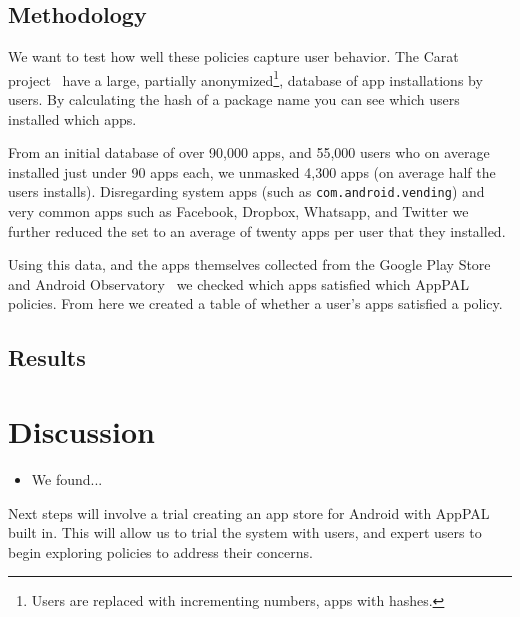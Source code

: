 \documentclass[twocolumn,letterpaper]{soups-poster}
\newcommand{\citep}[1]{\cite{#1}}
\begin{document}
\subsection{Methodology}

We want to test how well these policies capture user behavior.
The Carat project~\citep{Oliner:2013ht} have a large, partially
anonymized\footnote{Users are replaced with incrementing numbers, apps with
hashes.},
database of app installations by users.  By calculating the hash of a package
name you can see which users installed which apps.

From an initial database of over 90,000 apps, and 55,000 users who on average
installed just under 90 apps each, we unmasked 4,300 apps (on average half the
  users installs).  Disregarding system apps (such as
\texttt{com.android.vending}) and very common apps such as Facebook, Dropbox,
Whatsapp, and Twitter we further reduced the set to an average of twenty apps
per user that they installed.

Using this data, and the apps themselves collected from the Google Play Store
and Android Observatory~\citep{Barrera:2012iba} we checked which apps satisfied
which AppPAL policies.  From here we created a table of whether a user's apps
satisfied a policy.

\subsection{Results}

\fbox{\begin{minipage}{\linewidth}\hfill\vspace{3in}\end{minipage}}

\section{Discussion}

\begin{itemize}
    \item We found...
\end{itemize}

Next steps will involve a trial creating an app store for Android with AppPAL
built in.  This will allow us to trial the system with users, and expert users
to begin exploring policies to address their concerns.




\end{document}
